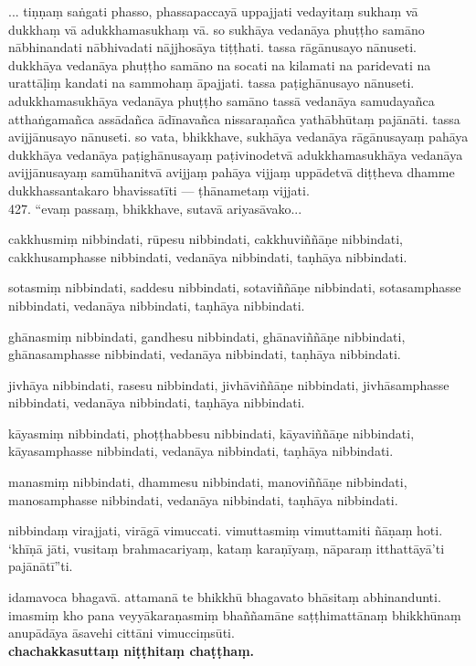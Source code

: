 \documentclass[11pt]{article}
\begin{document}
... tiṇṇaṃ saṅgati phasso, phassapaccayā uppajjati vedayitaṃ sukhaṃ vā dukkhaṃ vā adukkhamasukhaṃ vā. so sukhāya vedanāya phuṭṭho samāno nābhinandati nābhivadati nājjhosāya tiṭṭhati. tassa rāgānusayo nānuseti. dukkhāya vedanāya phuṭṭho samāno na socati na kilamati na paridevati na urattāḷiṃ kandati na sammohaṃ āpajjati. tassa paṭighānusayo nānuseti. adukkhamasukhāya vedanāya phuṭṭho samāno tassā vedanāya samudayañca atthaṅgamañca assādañca ādīnavañca nissaraṇañca yathābhūtaṃ pajānāti. tassa avijjānusayo nānuseti. so vata, bhikkhave, sukhāya vedanāya rāgānusayaṃ pahāya dukkhāya vedanāya paṭighānusayaṃ paṭivinodetvā adukkhamasukhāya vedanāya avijjānusayaṃ samūhanitvā avijjaṃ pahāya vijjaṃ uppādetvā diṭṭheva dhamme dukkhassantakaro bhavissatīti — ṭhānametaṃ vijjati.\\

427. “evaṃ passaṃ, bhikkhave, sutavā ariyasāvako...\

cakkhusmiṃ nibbindati, rūpesu nibbindati, cakkhuviññāṇe nibbindati, cakkhusamphasse nibbindati, vedanāya nibbindati, taṇhāya nibbindati.\

sotasmiṃ nibbindati, saddesu nibbindati, sotaviññāṇe nibbindati, sotasamphasse nibbindati, vedanāya nibbindati, taṇhāya nibbindati.\

ghānasmiṃ nibbindati, gandhesu nibbindati, ghānaviññāṇe nibbindati, ghānasamphasse nibbindati, vedanāya nibbindati, taṇhāya nibbindati.\

jivhāya nibbindati, rasesu nibbindati, jivhāviññāṇe nibbindati, jivhāsamphasse nibbindati, vedanāya nibbindati, taṇhāya nibbindati.\

kāyasmiṃ nibbindati, phoṭṭhabbesu nibbindati, kāyaviññāṇe nibbindati, kāyasamphasse nibbindati, vedanāya nibbindati, taṇhāya nibbindati.\

manasmiṃ nibbindati, dhammesu nibbindati, manoviññāṇe nibbindati, manosamphasse nibbindati, vedanāya nibbindati, taṇhāya nibbindati. \

nibbindaṃ virajjati, virāgā vimuccati. vimuttasmiṃ vimuttamiti ñāṇaṃ hoti. ‘khīṇā jāti, vusitaṃ brahmacariyaṃ, kataṃ karaṇīyaṃ, nāparaṃ itthattāyā’ti pajānātī”ti.\

idamavoca bhagavā. attamanā te bhikkhū bhagavato bhāsitaṃ abhinandunti. imasmiṃ kho pana veyyākaraṇasmiṃ bhaññamāne saṭṭhimattānaṃ bhikkhūnaṃ anupādāya āsavehi cittāni vimucciṃsūti.\\[.5cm]

\centering\textbf{chachakkasuttaṃ niṭṭhitaṃ chaṭṭhaṃ.}
\end{document}
